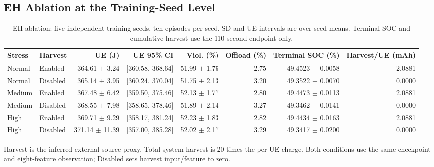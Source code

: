 \documentclass[conference]{IEEEtran}
\begin{document}
\subsection{EH Ablation at the Training-Seed Level}
\begin{table}[t]
\centering\footnotesize
\caption{EH ablation: five independent training seeds, ten episodes per seed. SD and UE intervals are over seed means. Terminal SOC and cumulative harvest use the 110-second endpoint only.}
\label{tab:eh}
\begin{tabular}{@{}llrrrrrr@{}}\toprule
Stress & Harvest & UE (J) & UE 95\% CI & Viol. (\%) & Offload (\%) & Terminal SOC (\%) & Harvest/UE (mAh)\\\midrule
Normal & Enabled & 364.61 $\pm$ 3.24 & [360.58, 368.64] & 51.99 $\pm$ 1.76 & 2.75 & 49.4523 $\pm$ 0.0058 & 2.0881 \\
Normal & Disabled & 365.14 $\pm$ 3.95 & [360.24, 370.04] & 51.75 $\pm$ 2.13 & 3.20 & 49.3522 $\pm$ 0.0070 & 0.0000 \\
Medium & Enabled & 367.48 $\pm$ 6.42 & [359.50, 375.46] & 52.13 $\pm$ 1.77 & 2.80 & 49.4473 $\pm$ 0.0113 & 2.0881 \\
Medium & Disabled & 368.55 $\pm$ 7.98 & [358.65, 378.46] & 51.89 $\pm$ 2.14 & 3.27 & 49.3462 $\pm$ 0.0141 & 0.0000 \\
High & Enabled & 369.71 $\pm$ 9.29 & [358.17, 381.24] & 52.23 $\pm$ 1.83 & 2.82 & 49.4434 $\pm$ 0.0163 & 2.0881 \\
High & Disabled & 371.14 $\pm$ 11.39 & [357.00, 385.28] & 52.02 $\pm$ 2.17 & 3.29 & 49.3417 $\pm$ 0.0200 & 0.0000 \\
\bottomrule\end{tabular}

\par\smallskip\begin{minipage}{\textwidth}\footnotesize Harvest is the inferred external-source proxy. Total system harvest is 20 times the per-UE charge. Both conditions use the same checkpoint and eight-feature observation; Disabled sets harvest input/feature to zero.\end{minipage}
\end{table}
\end{document}
